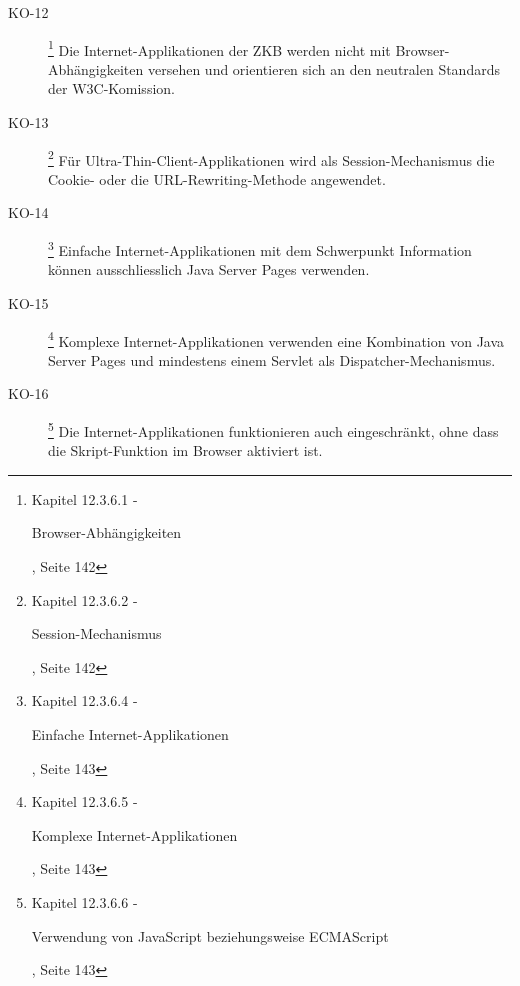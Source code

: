 \documentclass[
11pt, %
a4paper, %
BCOR25mm, %
DIV14, %
footsepline = false, %
headsepline, %
twoside, %
openright,
abstracton, %
listof=totocnumbered, %
bibliography=totocnumbered %
]{scrreprt}
\begin{document}
\begin{description}
    \item[KO-12\label{itm:KO-12}]
    \footnote{\cite{ZkbHandbuchDerItArchitektur} Kapitel 12.3.6.1 -
    \begin{itshape}Browser-Abhängigkeiten\end{itshape}, Seite 142}
    Die Internet-Applikationen der ZKB werden nicht mit Browser-Abhängigkeiten
    versehen und orientieren sich an den neutralen Standards der W3C-Komission.
    
    \item[KO-13\label{itm:KO-13}]
    \footnote{\cite{ZkbHandbuchDerItArchitektur} Kapitel 12.3.6.2 -
    \begin{itshape}Session-Mechanismus\end{itshape}, Seite 142}
    Für Ultra-Thin-Client-Applikationen wird als Session-Mechanismus die
    Cookie- oder die URL-Rewriting-Methode angewendet.
    
    \item[KO-14\label{itm:KO-14}]
    \footnote{\cite{ZkbHandbuchDerItArchitektur} Kapitel 12.3.6.4 -
    \begin{itshape}Einfache Internet-Applikationen\end{itshape}, Seite 143}
    Einfache Internet-Applikationen mit dem Schwerpunkt Information können
    ausschliesslich Java Server Pages verwenden.
    
    \item[KO-15\label{itm:KO-15}]
    \footnote{\cite{ZkbHandbuchDerItArchitektur} Kapitel 12.3.6.5 -
    \begin{itshape}Komplexe Internet-Applikationen\end{itshape}, Seite 143}
    Komplexe Internet-Applikationen verwenden eine Kombination von Java Server
    Pages und mindestens einem Servlet als Dispatcher-Mechanismus.
    
    \item[KO-16\label{itm:KO-16}]
    \footnote{\cite{ZkbHandbuchDerItArchitektur} Kapitel 12.3.6.6 -
    \begin{itshape}Verwendung von JavaScript beziehungsweise
    ECMAScript\end{itshape}, Seite 143}
    Die Internet-Applikationen funktionieren auch eingeschränkt, ohne dass die
    Skript-Funktion im Browser aktiviert ist.
    

\end{description}
\end{document}
